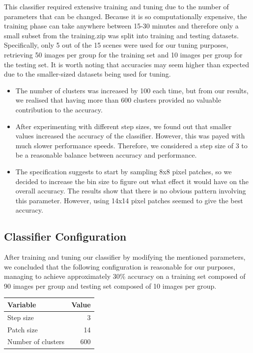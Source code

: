 \documentclass[a4paper]{article}
\begin{document}
This classifier required extensive training and tuning due to the number of parameters that can be changed. Because it is so computationally expensive, the training phase can take anywhere between 15-30 minutes and therefore only a small subset from the training.zip was split into training and testing datasets. Specifically, only 5 out of the 15 scenes were used for our tuning purposes, retrieving 50 images per group for the training set and 10 images per group for the testing set. It is worth noting that accuracies may seem higher than expected due to the smaller-sized datasets being used for tuning.\\

\begin{itemize}
\item The number of clusters was increased by 100 each time, but from our results, we realised that having more than 600 clusters provided no valuable contribution to the accuracy.
\item After experimenting with different step sizes, we found out that smaller values increased the accuracy of the classifier. However, this was payed with much slower performance speeds. Therefore, we considered a step size of 3 to be a reasonable balance between accuracy and performance.
\item The specification suggests to start by sampling 8x8 pixel patches, so we decided to increase the bin size to figure out what effect it would have on the overall accuracy. The results show that there is no obvious pattern involving this parameter. However, using 14x14 pixel patches seemed to give the best accuracy.
\end{itemize}

\subsection{Classifier Configuration}
After training and tuning our classifier by modifying the mentioned parameters, we concluded that the following configuration is reasonable for our purposes, managing to achieve approximately 30\% accuracy on a training set composed of 90 images per group and testing set composed of 10 images per group.\\
\begin{center}
	\def\arraystretch{1.5}%
    \begin{tabular}{ | l | r |}
    \hline
    \textbf{Variable} & \textbf{Value} \\ \hline
    Step size & 3 \\ \hline
    Patch size & 14 \\ \hline
    Number of clusters & 600 \\ \hline
    \end{tabular}
\end{center}
\bigskip
\end{document}
